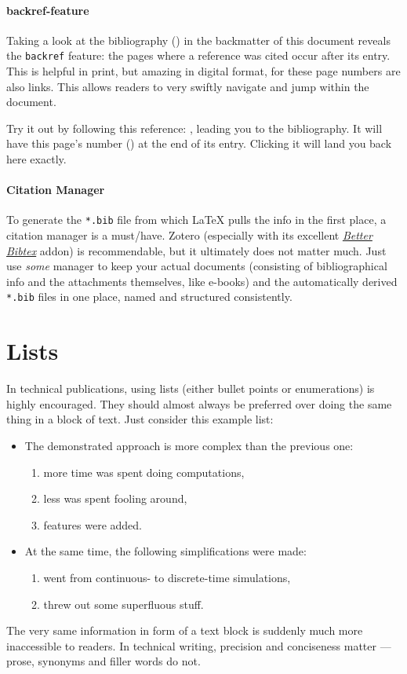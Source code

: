 \paragraph{backref-feature}
Taking a look at the bibliography () in the backmatter
of this document reveals the \texttt{backref} feature:
the pages where a reference was cited occur after its entry.
This is helpful in print, but amazing in digital format, for these page numbers
are also links.
This allows readers to very swiftly navigate and jump within the document.

Try it out by following this reference: \cite{diracPrinciplesQuantumMechanics1981},
leading you to the bibliography.
\label{backref_example}
It will have this page's number () at the end of its entry.
Clicking it will land you back here exactly.

\paragraph{Citation Manager}
To generate the \texttt{*.bib} file from which \LaTeX{} pulls the info in the
first place, a citation manager is a must\-/have.
Zotero
(especially with its excellent \href{https://retorque.re/zotero-better-bibtex/}{\emph{Better Bibtex}} addon)
is recommendable, but it ultimately does not matter much.
Just use \emph{some} manager to keep your actual documents
(consisting of bibliographical info and the attachments themselves, like e-books)
and the automatically derived \texttt{*.bib} files in one place,
named and structured consistently.

\section{Lists}

In technical publications, using lists (either bullet points or enumerations)
is highly encouraged.
They should almost always be preferred over doing the same thing in a block of text.
Just consider this example list:
\begin{itemize}
    \item The demonstrated approach is more complex than the previous one:
    \begin{enumerate}
        \item more time was spent doing computations,
        \item less was spent fooling around,
        \item features were added.
    \end{enumerate}
    \item At the same time, the following simplifications were made:
    \begin{enumerate}
        \item went from continuous- to discrete-time simulations,
        \item threw out some superfluous stuff.
    \end{enumerate}
\end{itemize}
The very same information in form of a text block is suddenly much more inaccessible
to readers.
In technical writing, precision and conciseness matter --- prose, synonyms and
filler words do not.

